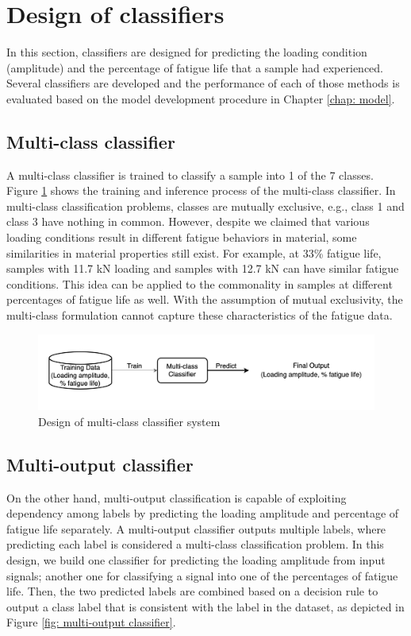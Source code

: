 \section{Design of classifiers}
\label{sec: design of classifiers}
In this section, classifiers are designed for predicting the loading condition (amplitude) and the percentage of fatigue life that a sample had experienced. Several classifiers are developed and the performance of each of those methods is evaluated based on the model development procedure in Chapter \ref{chap: model}.

\subsection{Multi-class classifier}
A multi-class classifier is trained to classify a sample into 1 of the 7 classes. Figure \ref{fig: multi-class classifier} shows the training and inference process of the multi-class classifier. In multi-class classification problems, classes are mutually exclusive, e.g., class 1 and class 3 have nothing in common. However, despite we claimed that various loading conditions result in different fatigue behaviors in material, some similarities in material properties still exist. For example, at 33\% fatigue life, samples with 11.7 kN loading and samples with 12.7 kN can have similar fatigue conditions. This idea can be applied to the commonality in samples at different percentages of fatigue life as well. With the assumption of mutual exclusivity, the multi-class formulation cannot capture these characteristics of the fatigue data.

\begin{figure}[tb]
    \centering
    \includegraphics[width=0.9\linewidth]{fig/multi-class_classifier.png}
    \caption{Design of multi-class classifier system}
    \label{fig: multi-class classifier}
\end{figure}

\subsection{Multi-output classifier}
\label{subsec: multi-output classifier}
On the other hand, multi-output classification is capable of exploiting dependency among labels \cite{multi-label-Zhang2014} by predicting the loading amplitude and percentage of fatigue life separately. A multi-output classifier outputs multiple labels, where predicting each label is considered a multi-class classification problem. In this design, we build one classifier for predicting the loading amplitude from input signals; another one for classifying a signal into one of the percentages of fatigue life. Then, the two predicted labels are combined based on a decision rule to output a class label that is consistent with the label in the dataset, as depicted in Figure \ref{fig: multi-output classifier}. 

